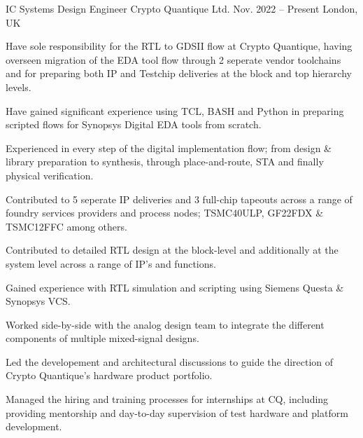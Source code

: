 

\begin{cventries}

    \cventry
      {IC Systems Design Engineer} %
      {Crypto Quantique Ltd.} %
      {Nov. 2022 -- Present} %
      {London, UK} %
      {
        \begin{cvitems} %
          \item {Have sole responsibility for the RTL to GDSII flow at Crypto Quantique, having overseen migration of the EDA tool flow through 2 seperate vendor toolchains and for preparing both IP and Testchip deliveries at the block and top hierarchy levels.}
          \item {Have gained significant experience using TCL, BASH and Python in preparing scripted flows for Synopsys Digital EDA tools from scratch.}
          \item {Experienced in every step of the digital implementation flow; from design \& library preparation to synthesis, through place-and-route, STA and finally physical verification.}
          \item {Contributed to 5 seperate IP deliveries and 3 full-chip tapeouts across a range of foundry services providers and process nodes; TSMC40ULP, GF22FDX \& TSMC12FFC among others.}
          \item {Contributed to detailed RTL design at the block-level and additionally at the system level across a range of IP's and functions.}
          \item {Gained experience with RTL simulation and scripting using Siemens Questa \& Synopsys VCS.}
          \item {Worked side-by-side with the analog design team to integrate the different components of multiple mixed-signal designs.}
          \item {Led the developement and architectural discussions to guide the direction of Crypto Quantique's hardware product portfolio.}
          \item {Managed the hiring and training processes for internships at CQ, including providing mentorship and day-to-day supervision of test hardware and platform development.}

\end{cvitems}}
\end{cventries}
